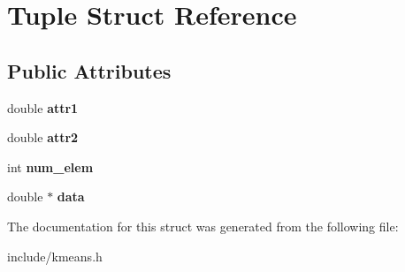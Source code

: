 \hypertarget{structTuple}{}\section{Tuple Struct Reference}
\label{structTuple}
\subsection*{Public Attributes}
\begin{DoxyCompactItemize}
\item 
\hypertarget{structTuple_accba76a29fdaf7c297f5b7c1fe0ebd90}{}double {\bfseries attr1}\label{structTuple_accba76a29fdaf7c297f5b7c1fe0ebd90}

\item 
\hypertarget{structTuple_aa1e5aade1f4ed385cc5f9ee9a7ddf80f}{}double {\bfseries attr2}\label{structTuple_aa1e5aade1f4ed385cc5f9ee9a7ddf80f}

\item 
\hypertarget{structTuple_af6d01de2865eb6d35c25e27e36c8616f}{}int {\bfseries num\+\_\+elem}\label{structTuple_af6d01de2865eb6d35c25e27e36c8616f}

\item 
\hypertarget{structTuple_a972e1995023f51c64f972407a6650e1f}{}double $\ast$ {\bfseries data}\label{structTuple_a972e1995023f51c64f972407a6650e1f}

\end{DoxyCompactItemize}


The documentation for this struct was generated from the following file\+:\begin{DoxyCompactItemize}
\item 
include/kmeans.\+h\end{DoxyCompactItemize}
